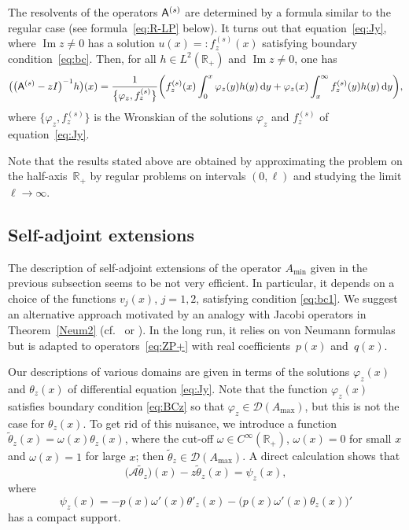 \documentclass[pdftex]{sigma}%
\numberwithin{equation}{section}
\begin{document}
 The resolvents of the operators ${\sf A}^{(s)}$ are determined by a formula similar to the regular case (see formula~\eqref{eq:R-LP} below). It turns out that equation~\eqref{eq:Jy}, where $\operatorname{Im} z\neq 0$ has a solution $u(x)=: f^{(s)}_{z} (x)$ satisfying boundary condition~\eqref{eq:bc}. Then, for all $ h\in L^2 ({\mathbb R}_{+})$ and $ \operatorname{Im} z\neq 0$, one has
 \[
\big( \big({\sf A}^{(s)}-z I \big)^{-1} h\big) (x) = \frac{1}{\big\{\varphi_{z}, f^{(s)}_{z}\big\}} \bigg(f_{z}^{(s)}(x) \int_{0}^x \varphi_{z}(y) h (y) \,{\rm d} y+
 \varphi_{z}(x) \int_x^\infty f_{z}^{(s)}(y) h (y) \,{\rm d}y\bigg),
 \]
where $\big\{\varphi_{z}, f^{(s)}_{z}\big\}$ is the Wronskian of the solutions $\varphi_{z}$ and $ f^{(s)}_{z}$ of equation~\eqref{eq:Jy}.

 Note that the results stated above are obtained by approximating the problem on the half-axis~${\mathbb R}_{+}$ by regular problems on intervals $(0,\ell)$ and studying the limit $\ell\to\infty$.

\subsection{Self-adjoint extensions}\label{section2.4}

 The description of self-adjoint extensions of the operator $A_{\min}$ given in the previous subsection seems to be not very efficient. In particular, it depends on a choice of the functions $v_{j}(x)$, $j=1,2$, satisfying condition \eqref{eq:bc1}. We suggest an alternative approach motivated by an analogy with Jacobi operators in Theorem~\ref{Neum2} (cf.\ \cite[Lemma~6.22 and Theorem~6.23]{Schm} or \cite[Theorem~2.6]{Simon}). In the long run, it relies on von Neumann formulas but is adapted to operators~\eqref{eq:ZP+} with real coefficients~$p(x)$ and~$q(x)$.

Our descriptions of various domains are given in terms of the solutions $\varphi_{z}(x)$ and $\theta_{z}(x)$ of differential equation \eqref{eq:Jy}. Note that the function $\varphi_{z}(x)$ satisfies boundary condition \eqref{eq:BCz} so that $\varphi_{z} \in {\mathcal D}(A_{\max})$, but this is not the case for $\theta_{z}(x)$. To get rid of this nuisance, we introduce a function $\tilde{\theta}_z (x)= \omega(x) \theta_z (x)$, where the cut-off $\omega\in C^\infty ({\mathbb R}_{+})$, $\omega(x)=0$ for small $x$ and $\omega(x)=1$ for large $x$; then $\tilde\theta_{z} \in {\mathcal D}(A_{\max})$. A direct calculation shows that
 \begin{equation}
 \big( {\mathcal A}\tilde{\theta}_z \big)(x)-z\tilde{\theta}_z (x)=\psi_{z}(x),
 \label{eq:the}\end{equation}
 where
 \begin{equation}
 \psi_{z}(x)= -p(x) \omega'(x) \theta'_{z} (x) - \big(p(x) \omega'(x) \theta_{z} (x) \big)'
 \label{eq:the1}\end{equation}
 has a compact support.
\end{document}
